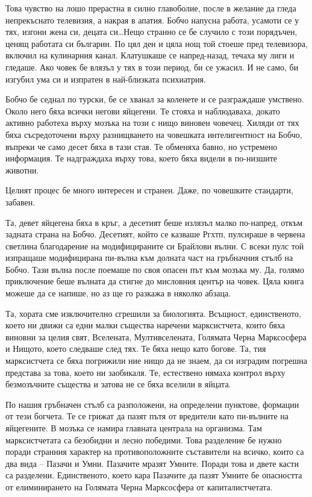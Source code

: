 \documentclass[ebook,openany,12pt]{memoir}
\begin{document}
Това чувство на лошо прерастна в силно главоболие, после в желание да гледа непрекъснато телевизия, а накрая в апатия. Бобчо напусна работа, усамоти се у тях, изгони жена си, децата си\ldots Нещо странно се бе случило с този порядъчен, ценящ работата си българин. По цял ден и цяла нощ той стоеше пред телевизора, включил на кулинарния канал. Клатушкаше се напред-назад, течаха му лиги и гледаше. Ако човек бе влязъл у тях в този период, би се ужасил. И не само, би изгубил ума си и изпратен в най-близката психиатрия.

Бобчо бе седнал по турски, бе се хванал за коленете и се разграждаше умствено. Около него бяха всички негови яйцегени. Те стояха и наблюдаваха, докато активно работеха върху мозъка на този с нищо виновен човечец. Хиляди от тях бяха съсредоточени върху разнищването на човешката интелигентност на Бобчо, въпреки че само десет бяха в тази стая. Те обменяха бавно, но устремено информация. Те надграждаха върху това, което бяха видели в по-низшите животни.

Целият процес бе много интересен и странен. Даже, по човешките стандарти, забавен.

Та, девет яйцегена бяха в кръг, а десетият беше излязъл малко по-напред, откъм задната страна на Бобчо. Десетият, който се казваше Ргхтп, пулсираше в червена светлина благодарение на модифицираните си Брайлови вълни. С всеки пулс той изпращаше модифицирана пи-вълна към долната част на гръбначния стълб на Бобчо. Тази вълна после поемаше по своя опасен път към мозъка му. Да, голямо приключение беше вълната да стигне до мисловния център на човек. Цяла книга можеше да се напише, но аз ще го разкажа в няколко абзаца.

Та, хората сме изключително сгрешили за биологията. Всъщност, единственото, което ни движи са едни малки същества наречени марксистчета, които бяха виновни за целия свят, Вселената, Мултивселената, Голямата Черна Марксосфера и Нищото, което следваше след тях. Те бяха нещо като богове. Та, тия марксистчета се бяха погрижили ние нищо да не знаем, да си изградим погрешна представа за това, което ни заобикаля. Те, естествено нямаха контрол върху безмозъчните същества и затова не се бяха вселили в яйцата.

По нашия гръбначен стълб са разположени, на определени пунктове, формации от тези богчета. Те се грижат да пазят пътя от вредители като пи-вълните на яйцегените. В мозъка се намира главната централа на организма. Там марксистчетата са безобидни и лесно победими. Това разделение бе нужно поради странния характер на противоположните съставители на всичко, които са два вида – Пазачи и Умни. Пазачите мразят Умните. Поради това и двете касти са разделени. Единственото, което кара Пазачите да пазят Умните бе опасността от елиминирането на Голямата Черна Марксосфера от капиталистчетата.
\end{document}
